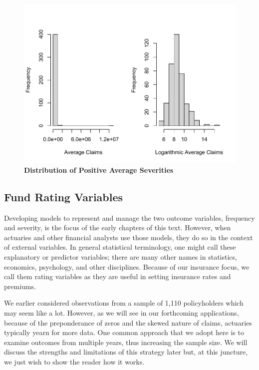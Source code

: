 \documentclass[
]{book}
\begin{document}
\begin{figure}

{\centering \includegraphics[width=0.8\linewidth]{LossDataAnalytics_files/figure-latex/SeverityFig-1} 

}

\caption{\textbf{Distribution of Positive Average Severities}}\label{fig:SeverityFig}
\end{figure}

\hypertarget{S:FundVariables}{%
\subsection{Fund Rating Variables}\label{S:FundVariables}}

Developing models to represent and manage the two outcome variables,
frequency and severity, is the focus of the early chapters of this text.
However, when actuaries and other financial analysts use those models,
they do so in the context of external variables. In general
statistical terminology, one might call these explanatory or predictor
variables; there are many other names in statistics, economics,
psychology, and other disciplines. Because of our insurance focus, we
call them rating variables as they are useful in setting insurance rates and premiums.

We earlier considered observations from a sample of 1,110 policyholders which may seem like
a lot. However, as we will see in our forthcoming applications, because
of the preponderance of zeros and the skewed nature of claims, actuaries
typically yearn for more data. One common approach that we adopt here is
to examine outcomes from multiple years, thus increasing the sample
size. We will discuss the strengths and limitations of this strategy
later but, at this juncture, we just wish to show the reader how it works.
\end{document}
